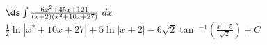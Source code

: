 {$\ds \int \frac{6x^2+45x+121}{(x+2)(x^2+10x+27)}\ dx$}
{$\frac{1}{2} \ln \left|x^2+10 x+27\right|+5 \ln |x+2|-6 \sqrt{2} \tan \
^{-1}\left(\frac{x+5}{\sqrt{2}}\right) +C$}
